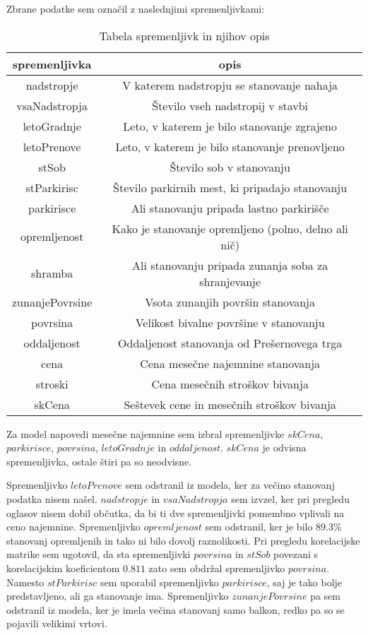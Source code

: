 \documentclass[a4paper, 12pt]{article}
\begin{document}
Zbrane podatke sem označil z naslednjimi spremenljivkami:
\begin{table}[h]
\begin{center}
\caption{Tabela spremenljivk in njihov opis}
\label{table:1}
\begin{tabular}{ c|c}
	spremenljivka & opis \\
	\hline
	\hline
	nadstropje & V katerem nadstropju se stanovanje nahaja \\
	\hline
	vsaNadstropja & Število vseh nadstropij v stavbi \\
	\hline
	letoGradnje & Leto, v katerem je bilo stanovanje zgrajeno \\
	\hline
	letoPrenove & Leto, v katerem je bilo stanovanje prenovljeno \\
	\hline
	stSob & Število sob v stanovanju \\
	\hline
	stParkirisc & Število parkirnih mest, ki pripadajo stanovanju \\
	\hline
	parkirisce & Ali stanovanju pripada lastno parkirišče \\
	\hline
	opremljenost & Kako je stanovanje opremljeno (polno, delno ali nič) \\
	\hline
	shramba & Ali stanovanju pripada zunanja soba za shranjevanje \\
	\hline
	zunanjePovrsine & Vsota zunanjih površin stanovanja \\
	\hline
	povrsina & Velikost bivalne površine v stanovanju \\
	\hline
	oddaljenost & Oddaljenost stanovanja od Prešernovega trga \\
	\hline
	cena & Cena mesečne najemnine stanovanja \\
	\hline
	stroski & Cena mesečnih stroškov bivanja \\
	\hline
	skCena & Seštevek cene in mesečnih stroškov bivanja \\
\end{tabular}
\end{center}
\end{table}

Za model napovedi mesečne najemnine sem izbral spremenljivke $ skCena $,
$ parkirisce $, $ povrsina $, $ letoGradnje $ in
$ oddaljenost $. $ skCena $ je odvisna spremenljivka, ostale štiri pa
so neodvisne.

Spremenljivko $ letoPrenove $ sem odstranil iz modela, ker za večino
stanovanj podatka nisem našel. $ nadstropje $ in $ vsaNadstropja $
sem izvzel, ker pri pregledu oglasov nisem dobil občutka, da bi ti dve
spremenljivki pomembno vplivali na ceno najemnine. Spremenljivko
$ opremljenost $ sem odstranil, ker je bilo $ 89.3\% $ stanovanj
opremljenih in tako ni bilo dovolj raznolikosti. Pri pregledu korelacijske
matrike sem ugotovil, da sta spremenljivki $ povrsina $ in
$ stSob $ povezani s korelacijskim koeficientom $ 0.811 $ zato sem obdržal
spremenljivko $ povrsina $. Namesto $ stParkirisc $ sem uporabil
spremenljivko $ parkirisce $, saj je tako bolje predstavljeno, ali ga
stanovanje ima. Spremenljivko $ zunanjePovrsine $ pa sem  odstranil iz
modela, ker je imela večina stanovanj samo balkon, redko pa so se pojavili
velikimi vrtovi.
\end{document}
